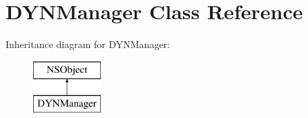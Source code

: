 \hypertarget{interface_d_y_n_manager}{\section{D\-Y\-N\-Manager Class Reference}
\label{interface_d_y_n_manager}
}
Inheritance diagram for D\-Y\-N\-Manager\-:\begin{figure}[H]
\begin{center}
\leavevmode
\includegraphics[height=2.000000cm]{interface_d_y_n_manager}
\end{center}
\end{figure}
